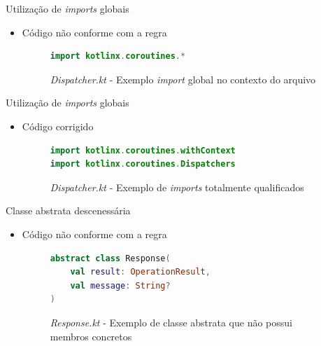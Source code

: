 \documentclass[brazilian]{beamer}
\begin{document}
\begin{frame}[fragile]{Utilização de \textit{imports} globais}
    \begin{itemize}
        \item Código não conforme com a regra
        \begin{figure}[H]
            \centering
            \begin{lstlisting}[language=Kotlin]
import kotlinx.coroutines.*
            \end{lstlisting}
            \caption{\textit{Dispatcher.kt} - Exemplo \textit{import} global no contexto do arquivo}
            \label{fig:detekt_wildcard_imports_before_example}
        \end{figure}
    \end{itemize}
\end{frame}

\begin{frame}[fragile]{Utilização de \textit{imports} globais}
    \begin{itemize}
        \item Código corrigido
        \begin{figure}[H]
            \centering
            \begin{lstlisting}[language=Kotlin]
import kotlinx.coroutines.withContext
import kotlinx.coroutines.Dispatchers
            \end{lstlisting}
            \caption{\textit{Dispatcher.kt} - Exemplo de \textit{imports} totalmente qualificados}
            \label{fig:detekt_wildcard_imports_after_example}
        \end{figure}
    \end{itemize}
\end{frame}

\begin{frame}[fragile]{Classe abstrata descenessária}
    \begin{itemize}
        \item Código não conforme com a regra
        \begin{figure}[H]
            \centering
            \begin{lstlisting}[language=Kotlin]
abstract class Response(
    val result: OperationResult,
    val message: String?
)
            \end{lstlisting}
            \caption{\textit{Response.kt} - Exemplo de classe abstrata que não possui membros concretos}
            \label{fig:detekt_unnecessary_abstract_class_before_example}
        \end{figure}
    \end{itemize}
\end{frame}
\end{document}
